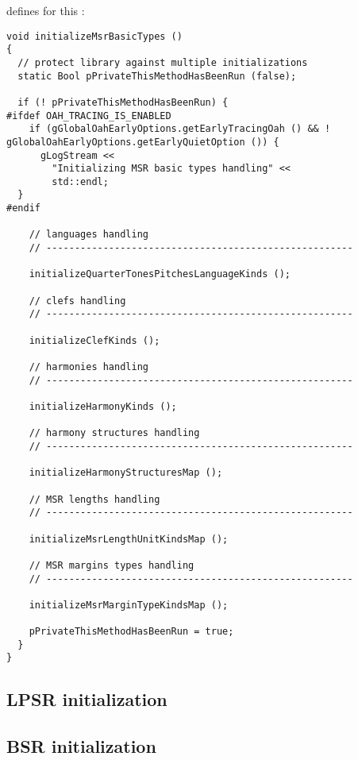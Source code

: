  defines  for this \initialization:
\begin{lstlisting}[language=CPlusPlus]
void initializeMsrBasicTypes ()
{
  // protect library against multiple initializations
  static Bool pPrivateThisMethodHasBeenRun (false);

  if (! pPrivateThisMethodHasBeenRun) {
#ifdef OAH_TRACING_IS_ENABLED
    if (gGlobalOahEarlyOptions.getEarlyTracingOah () && ! gGlobalOahEarlyOptions.getEarlyQuietOption ()) {
      gLogStream <<
        "Initializing MSR basic types handling" <<
        std::endl;
  }
#endif

    // languages handling
    // ------------------------------------------------------

    initializeQuarterTonesPitchesLanguageKinds ();

    // clefs handling
    // ------------------------------------------------------

    initializeClefKinds ();

    // harmonies handling
    // ------------------------------------------------------

    initializeHarmonyKinds ();

    // harmony structures handling
    // ------------------------------------------------------

    initializeHarmonyStructuresMap ();

    // MSR lengths handling
    // ------------------------------------------------------

    initializeMsrLengthUnitKindsMap ();

    // MSR margins types handling
    // ------------------------------------------------------

    initializeMsrMarginTypeKindsMap ();

    pPrivateThisMethodHasBeenRun = true;
  }
}
\end{lstlisting}


\subsection{LPSR initialization}


\subsection{BSR initialization}


